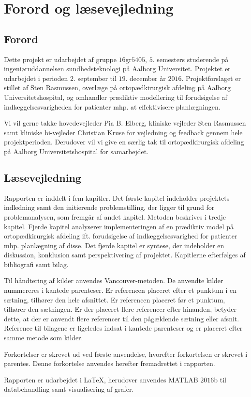 \chapter*{Forord og læsevejledning}

\section*{Forord}
Dette projekt er udarbejdet af gruppe $16$gr$5405$, $5$. semesters studerende på ingeniøruddannelsen sundhedsteknologi på Aalborg Universitet. Projektet er udarbejdet i perioden $2$. september til $19$. december år $2016$. Projektforslaget er stillet af Sten Rasmussen, overlæge på ortopædkirurgisk afdeling på Aalborg Universitetshospital, og omhandler prædiktiv modellering til forudsigelse af indlæggelsesvarigheden for patienter mhp. at effektivisere planlægningen. 


Vi vil gerne takke hovedevejleder Pia B. Elberg, kliniske vejleder Sten Rasmussen samt kliniske bi-vejleder Christian Kruse for vejledning og feedback gennem hele projektperioden. Derudover vil vi give en særlig tak til ortopædkirurgisk afdeling på Aalborg Universitetshospital for samarbejdet. 


\section*{Læsevejledning}
Rapporten er inddelt i fem kapitler. Det første kapitel indeholder projektets indledning samt den initierende problemstilling, der ligger til grund for problemanalysen, som fremgår af andet kapitel. Metoden beskrives i tredje kapitel. Fjerde kapitel analyserer implementeringen af en prædiktiv model på ortopædkirurgisk afdeling ift. forudsigelse af indlæggelsesvarighed for patienter mhp. planlægning af disse. Det fjerde kapitel er syntese, der indeholder en diskussion, konklusion samt perspektivering af projektet. Kapitlerne efterfølges af bibliografi samt bilag. 


Til håndtering af kilder anvendes Vancouver-metoden. De anvendte kilder nummereres i kantede parenteser. Er referencen placeret efter et punktum i en sætning, tilhører den hele afsnittet. Er referencen placeret før et punktum, tilhører den sætningen. Er der placeret flere referencer efter hinanden, betyder dette, at der er anvendt flere referencer til den pågældende sætning eller afsnit. Reference til bilagene er ligeledes indsat i kantede parenteser og er placeret efter samme metode som kilder. 

Forkortelser er skrevet ud ved første anvendelse, hvorefter forkortelsen er skrevet i parentes. Denne forkortelse anvendes herefter fremadrettet i rapporten. 


Rapporten er udarbejdet i \LaTeX, herudover anvendes MATLAB $2016$b til databehandling samt visualisering af grafer. 
